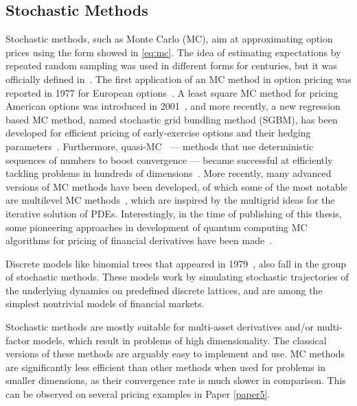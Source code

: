 \documentclass{UUThesisTemplate}
\begin{document}
%



%
\subsection{Stochastic Methods}

\par
Stochastic methods, such as Monte Carlo (MC), aim at approximating option prices using the form showed in \eqref{eq:mc}. The idea of estimating expectations by repeated random sampling was used in different forms for centuries, but it was officially defined in~\cite{metropolis1949monte}. The first application of an MC method in option pricing was reported in 1977 for European options~\cite{boyle1977options}. A least square MC method for pricing American options was introduced in 2001~\cite{longstaff2001valuing}, and more recently, a new regression based MC method, named stochastic grid bundling method (SGBM), has been developed for efficient pricing of early-exercise options and their hedging parameters~\cite{jain2015stochastic}. Furthermore, quasi-MC~\cite{paskov1995faster} --- methods that use deterministic sequences of numbers to boost convergence --- became successful at efficiently tackling problems in hundreds of dimensions~\cite{dick2013high}. More recently, many advanced versions of MC methods have been developed, of which some of the most notable are multilevel MC methods~\cite{giles2008multilevel}, which are inspired by the multigrid ideas for the iterative solution of PDEs. %
Interestingly, in the time of publishing of this thesis, some pioneering approaches in development of quantum computing MC algorithms for pricing of financial derivatives have been made~\cite{rebentrost2018quantum}.

\par
Discrete models like binomial trees that appeared in 1979~\cite{cox1979option, rendleman1979two}, also fall in the group of stochastic methods. These models work by simulating stochastic trajectories of the underlying dynamics on predefined discrete lattices, and are among the simplest nontrivial models of financial markets. 

\par
Stochastic methods are mostly suitable for multi-asset derivatives and/or multi-factor models, which result in problems of high dimensionality. The classical versions of these methods are arguably easy to implement and use. MC methods are significantly less efficient than other methods when used for problems in smaller dimensions, as their convergence rate is much slower in comparison. This can be observed on several pricing examples in Paper \ref{paper5}. 
%
\end{document}
